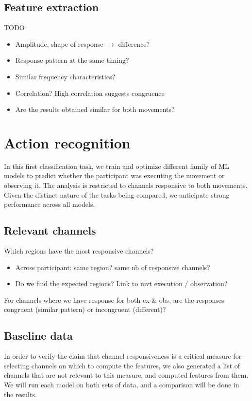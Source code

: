 \documentclass[10pt,conference,compsocconf]{IEEEtran}
\begin{document}
\subsection{Feature extraction}
TODO

\begin{itemize}
    \item Amplitude, shape of response \(\to\) difference?
    \item Response pattern at the same timing?
    \item Similar frequency characteristics?
    \item Correlation? High correlation suggests congruence
    \item Are the results obtained similar for both movements?
\end{itemize}

\section{Action recognition}
\label{sec:actionrecognition}
In this first classification task, we train and optimize different family of ML models to predict whether the participant was executing the movement or observing it. The analysis is restricted to channels responsive to both movements. Given the distinct nature of the tasks being compared, we anticipate strong performance across all models.

\subsection{Relevant channels}
Which regions have the most responsive channels?

\begin{itemize}
    \item Across participant: same region? same nb of responsive channels?
    \item Do we find the expected regions? Link to mvt execution / observation?
\end{itemize}

For channels where we have response for both ex \& obs, are the responses congruent (similar pattern) or incongruent (different)?

\subsection{Baseline data}
In order to verify the claim that channel responsiveness is a critical measure for selecting channels on which to compute the features, we also generated a list of channels that are not relevant to this measure, and computed features from them. We will run each model on both sets of data, and a comparison will be done in the results.
\end{document}
